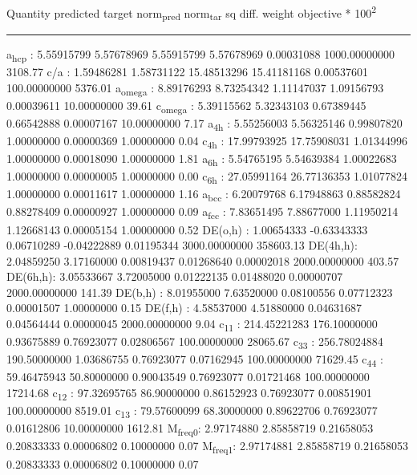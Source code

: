 \documentclass[11pt]{article}
\begin{document}
Quantity      predicted    target     norm\textsubscript{pred}   norm\textsubscript{tar}    sq diff.      weight    objective * 100\textsuperscript{2} 

\noindent\rule{\textwidth}{0.5pt}
a\textsubscript{hcp}   :   5.55915799   5.57678969   5.55915799   5.57678969   0.00031088 1000.00000000      3108.77
c/a     :   1.59486281   1.58731122  15.48513296  15.41181168   0.00537601 100.00000000      5376.01
a\textsubscript{omega} :   8.89176293   8.73254342   1.11147037   1.09156793   0.00039611  10.00000000        39.61
c\textsubscript{omega} :   5.39115562   5.32343103   0.67389445   0.66542888   0.00007167  10.00000000         7.17
a\textsubscript{4h}    :   5.55256003   5.56325146   0.99807820   1.00000000   0.00000369   1.00000000         0.04
c\textsubscript{4h}    :  17.99793925  17.75908031   1.01344996   1.00000000   0.00018090   1.00000000         1.81
a\textsubscript{6h}    :   5.54765195   5.54639384   1.00022683   1.00000000   0.00000005   1.00000000         0.00
c\textsubscript{6h}    :  27.05991164  26.77136353   1.01077824   1.00000000   0.00011617   1.00000000         1.16
a\textsubscript{bcc}   :   6.20079768   6.17948863   0.88582824   0.88278409   0.00000927   1.00000000         0.09
a\textsubscript{fcc}   :   7.83651495   7.88677000   1.11950214   1.12668143   0.00005154   1.00000000         0.52
DE(o,h) :   1.00654333  -0.63343333   0.06710289  -0.04222889   0.01195344 3000.00000000    358603.13
DE(4h,h):   2.04859250   3.17160000   0.00819437   0.01268640   0.00002018 2000.00000000       403.57
DE(6h,h):   3.05533667   3.72005000   0.01222135   0.01488020   0.00000707 2000.00000000       141.39
DE(b,h) :   8.01955000   7.63520000   0.08100556   0.07712323   0.00001507   1.00000000         0.15
DE(f,h) :   4.58537000   4.51880000   0.04631687   0.04564444   0.00000045 2000.00000000         9.04
c\textsubscript{11}    : 214.45221283 176.10000000   0.93675889   0.76923077   0.02806567 100.00000000     28065.67
c\textsubscript{33}    : 256.78024884 190.50000000   1.03686755   0.76923077   0.07162945 100.00000000     71629.45
c\textsubscript{44}    :  59.46475943  50.80000000   0.90043549   0.76923077   0.01721468 100.00000000     17214.68
c\textsubscript{12}    :  97.32695765  86.90000000   0.86152923   0.76923077   0.00851901 100.00000000      8519.01
c\textsubscript{13}    :  79.57600099  68.30000000   0.89622706   0.76923077   0.01612806  10.00000000      1612.81
M\textsubscript{freq}\textsubscript{0}:   2.97174880   2.85858719   0.21658053   0.20833333   0.00006802   0.10000000         0.07
M\textsubscript{freq}\textsubscript{1}:   2.97174881   2.85858719   0.21658053   0.20833333   0.00006802   0.10000000         0.07
\end{document}
